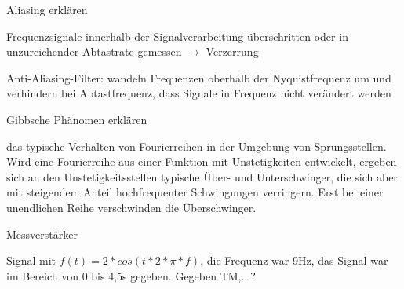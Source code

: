 \documentclass[10pt, a4paper]{exam}
\begin{document}
\begin{questions}
  \question Aliasing erklären
  \begin{solution}
    Frequenzsignale innerhalb der Signalverarbeitung überschritten oder in unzureichender Abtastrate gemessen $\rightarrow$ Verzerrung

    Anti-Aliasing-Filter: wandeln Frequenzen oberhalb der Nyquistfrequenz um und verhindern bei Abtastfrequenz, dass Signale in Frequenz nicht verändert werden
  \end{solution}

  \question Gibbsche Phänomen erklären
  \begin{solution}
    das typische Verhalten von Fourierreihen in der Umgebung von Sprungsstellen. Wird eine Fourierreihe aus einer Funktion mit Unstetigkeiten entwickelt, ergeben sich an den Unstetigkeitsstellen typische Über- und Unterschwinger, die sich aber mit steigendem Anteil hochfrequenter Schwingungen verringern. Erst bei einer unendlichen Reihe verschwinden die Überschwinger.
  \end{solution}

  \question Messverstärker

  \question Signal mit $f(t)=2*cos(t*2*\pi *f)$, die Frequenz war 9Hz, das Signal war im Bereich von 0 bis 4,5s gegeben. Gegeben TM,...?
  \begin{parts}

\end{parts}
\end{questions}
\end{document}
